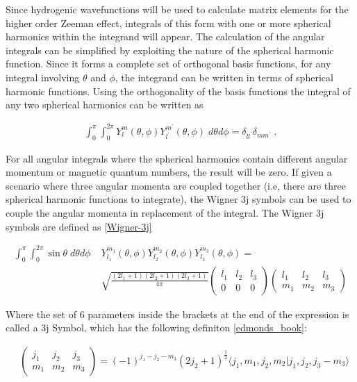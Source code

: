         Since hydrogenic wavefunctions will be used to calculate matrix elements for the higher order Zeeman effect, integrals of this form with one or more spherical harmonics within the integrand will appear. The calculation of the angular integrals can be simplified by exploiting the nature of the spherical harmonic function. Since it forms a complete set of orthogonal basis functions, for any integral involving $\theta$ and $\phi$, the integrand can be written in terms of spherical harmonic functions. Using the orthogonality of the basis functions the integral of any two spherical harmonics can be written as

        \begin{align}
            \int_0^\pi \int_0^{2\pi} Y^m_l(\theta, \phi) Y^{m^\prime}_{l^\prime} (\theta, \phi) \; d\theta d\phi = \delta_{ll^\prime} \delta_{mm^\prime}\label{eq:delta_spherical_harmonic}\;.
        \end{align}

        For all angular integrals where the spherical harmonics contain different angular momentum or magnetic quantum numbers, the result will be zero. If given a scenario where three angular momenta are coupled together (i.e, there are three spherical harmonic functions to integrate), the Wigner 3j symbols can be used to couple the angular momenta in replacement of the integral. The Wigner 3j symbols are defined as \ref{Wigner-3j}

        \begin{align}
            \int_0^\pi \int_0^{2\pi} \sin \theta \; d\theta d\phi\;& Y^{m_1}_{l_1}(\theta, \phi) Y^{m_2}_{l_2} (\theta, \phi) Y^{m_3}_{l_3} (\theta, \phi) =\\
             &\sqrt{\frac{(2l_1 + 1)(2l_2 + 1) (2l_3 + 1)}{4 \pi}} \begin{pmatrix}
                l_1 & l_2 & l_3 \\
                0 & 0 & 0
            \end{pmatrix} \begin{pmatrix}
                l_1 & l_2 & l_3 \\
                m_1 & m_2 & m_3 
            \end{pmatrix} \nonumber
        \end{align}

        Where the set of $6$ parameters inside the brackets at the end of the expression is called a $3$j Symbol, which has the following definiton \ref{edmonds_book}:

        \begin{align} \label{3j_1}
            &\begin{pmatrix}
                j_1 & j_2 & j_3\\
                m_1 & m_2 & m_3
            \end{pmatrix} = (-1)^{j_1 - j_2 - m_3} \left( 2j_2 + 1\right)^{\frac{1}{2}} \langle j_1, m_1, j_2, m_2 \vert j_1, j_2, j_3 - m_3 \rangle
        \end{align}

